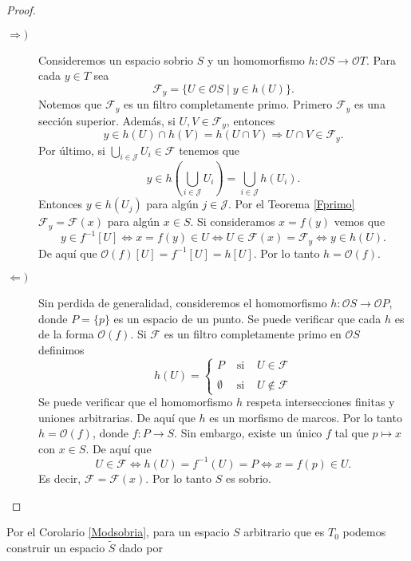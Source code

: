 \begin{proof}
    \begin{description}
        \item[$\Rightarrow )$] Consideremos un espacio sobrio $S$ y un homomorfismo $h\colon \mathcal{O}S\to \mathcal{O}T$. Para cada $y\in T$ sea 
        \[
        \mathcal{F}_y=\{U\in \mathcal{O}S\mid y\in h(U)\}.
        \]
        Notemos que $\mathcal{F}_y$ es un filtro completamente primo. Primero $\mathcal{F}_y$ es una sección superior. Además, si $U, V\in \mathcal{F}_y$, entonces
        \[
        y\in h(U)\cap h(V)=h(U\cap V)\Rightarrow U\cap V\in \mathcal{F}_y.
        \]
        Por último, si $\bigcup_{i\in\mathcal{J}}U_i\in\mathcal{F}$ tenemos que 
        \[
        y\in h(\bigcup_{i\in \mathcal{J}}U_i)=\bigcup_{i\in\mathcal{J}}h(U_i).
        \]
        Entonces $y\in h(U_j)$ para algún $j\in \mathcal{J}$. Por el Teorema \ref{Fprimo} $\mathcal{F}_y=\mathcal{F}(x)$ para algún $x\in S$. Si consideramos $x=f(y)$ vemos que 
        \[
        y\in f^{-1}[U]\Leftrightarrow x=f(y)\in U\Leftrightarrow U\in \mathcal{F}(x)=\mathcal{F}_y\Leftrightarrow y\in h(U).
        \]
        De aquí que $\mathcal{O}(f)[U]=f^{-1}[U]=h[U]$. Por lo tanto $h=\mathcal{O}(f)$.
        \item[$\Leftarrow )$] Sin perdida de generalidad, consideremos el homomorfismo $h\colon \mathcal{O}S\to \mathcal{O}P$, donde $P=\{p\}$ es un espacio de un punto. Se puede verificar que cada $h$ es de la forma $\mathcal{O}(f)$. Si 
        $\mathcal{F}$ es un filtro completamente primo en $\mathcal{O}S$ definimos 
        \[
        h(U)= \left\{ \begin{array}{lcc} P & \mbox{ si } & U\in \mathcal{F} \\ \\ \emptyset & \mbox{ si } & U\notin \mathcal{F} \end{array} \right.
        \]
        Se puede verificar que el homomorfismo $h$ respeta intersecciones finitas y uniones arbitrarias. De aquí que $h$ es un morfismo de marcos. Por lo tanto $h=\mathcal{O}(f)$, donde $f\colon P\to S$. Sin embargo, existe un único $f$ tal que $p\mapsto x$ con $x\in S$. De aquí que
        \[
        U\in \mathcal{F}\Leftrightarrow h(U)=f^{-1}(U)=P\Leftrightarrow x=f(p)\in U.
        \]
        Es decir, $\mathcal{F}=\mathcal{F}(x)$. Por lo tanto $S$ es sobrio.
    \end{description}
\end{proof}

Por el Corolario \ref{Modsobria}, para un espacio $S$ arbitrario que es $T_0$ podemos construir un espacio $\tilde{S}$ dado por 

